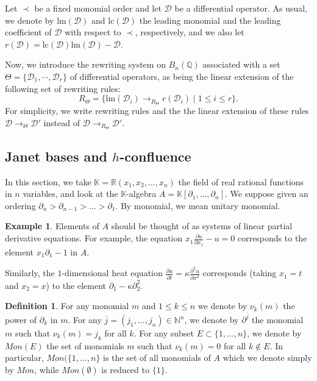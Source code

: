 \documentclass[10pt]{easychair}
\theoremstyle{definition}
\newtheorem{definition}[theorem]{Definition}
\newtheorem{example}[theorem]{Example}
\newcommand\D{\mathcal{D}}
\newcommand\lm{\text{lm}}
\newcommand\lc{\text{lc}}
\newcommand\K{\mathbb{K}}
\newcommand\Q{\mathbb{Q}}
\newcommand\Weyl{B_n(\Q)}
\newcommand\rewTheta{\to_{\Theta}}
\begin{document}
Let $\prec$ be a fixed monomial order and let $\D$ be a differential
operator. As usual, we denote by $\lm(\D)$ and $\lc(\D)$ the leading
monomial and the leading coefficient of $\D$ with respect to $\prec$,
respectively, and we also let $r(\D)=\lc(\D)\lm(\D)-\D$. 
\medskip

Now, we introduce the rewriting system on $\Weyl$ associated with a set
$\Theta=\{\D_1,\cdots,\D_r\}$ of differential operators, as being the
linear extension of the following set of rewriting rules:
\[R_{\Theta}=\Big\{\lm(\D_i)\to_{R_\Theta}r(\D_i)\mid 1\leq i\leq r
\Big\}.\]
For simplicity, we write rewriting rules and the the linear extension of
these rules $\D\rewTheta\D'$ instead of $\D\to_{R_\Theta}\D'$.

\subsection{Janet bases and $h$-confluence}
\label{sec:Janet_bases_and_h_confluence}

In this section, we take $\K = \mathbb R(x_1,x_2,\ldots,x_n)$ the field of real rational functions in $n$ variables, and look at the $\K$-algebra $A = \K[\partial_1,\ldots,\partial_n]$. We suppose given an ordering $\partial_n > \partial_{n-1} > \ldots > \partial_1$. By monomial, we mean unitary monomial.

\begin{example}
  Elements of $A$ should be thought of as systems of linear partial derivative equations. For example, the equation $x_1 \frac{\partial u}{\partial x_1} - u = 0$ corresponds to the element $x_1 \partial_1 - 1$ in $A$.

  Similarly, the $1$-dimensional heat equation $\frac{\partial u}{\partial t} = \kappa \frac{\partial^2 u}{\partial x^2}$  corresponds (taking $x_1 = t$ and $x_2 = x$) to the element $\partial_1 - \kappa \partial_2^2$.
\end{example}

\begin{definition}
 For any monomial $m$ and $1 \leq k \leq n$ we denote by $\nu_k(m)$ the power of $\partial_k$ in $m$.
For any $\overline j =(j_1,\ldots,j_n) \in \mathbb N^n$, we denote by $\partial^{\overline j}$ the monomial $m$ such that $\nu_k(m) = j_k$ for all $k$. For any subset $E \subset \{1,\ldots,n\}$, we denote by $Mon(E)$ the set of monomials $m$ such that $\nu_k(m) = 0$ for all $k \notin E$. In particular, $Mon(\{1,\ldots,n\}$ is the set of all monomials of $A$ which we denote simply by $Mon$, while $Mon(\emptyset)$ is reduced to $\{1\}$. 
\end{definition}
\end{document}
